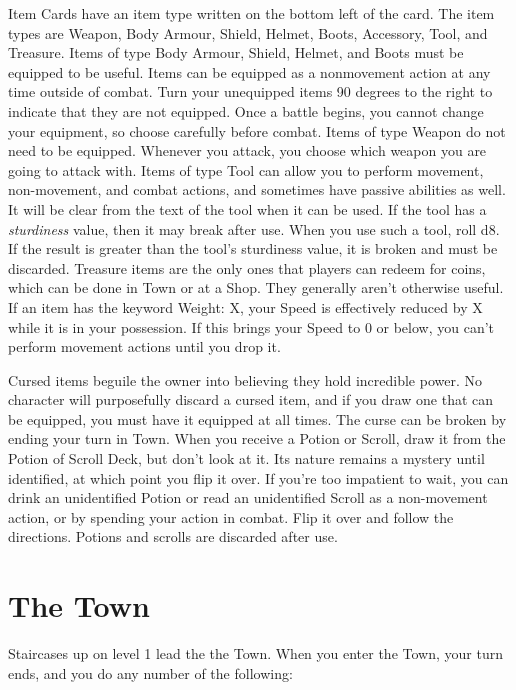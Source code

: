 \documentclass{book}
\begin{document}
Item Cards have an item type written on the bottom left of the card. The item types are Weapon, Body Armour, Shield, Helmet, Boots, Accessory, Tool, and Treasure.
Items of type Body Armour, Shield, Helmet, and Boots must be equipped to be useful. Items can be equipped as a nonmovement action at any time outside of combat. Turn your unequipped items 90 degrees to the right to indicate that they are not equipped. Once a battle begins, you cannot change your equipment, so choose carefully before combat.
Items of type Weapon do not need to be equipped. Whenever you attack, you choose which weapon you are going to attack with.
Items of type Tool can allow you to perform movement, non-movement, and combat actions, and sometimes have passive abilities as well. It will be clear from the text of the tool when it can be used. If the tool has a \emph{sturdiness} value, then it may break after use. When you use such a tool, roll d8. If the result is greater than the tool’s sturdiness value, it is broken and must be discarded.
Treasure items are the only ones that players can redeem for coins, which can be done in Town or at a Shop. They generally aren’t otherwise useful.
If an item has the keyword Weight: X, your Speed is effectively reduced by X while it is in your possession.  If this brings your Speed to 0 or below, you can’t perform movement actions until you drop it.

Cursed items beguile the owner into believing they hold incredible power. No character will purposefully discard a cursed item, and if you draw one that can be equipped, you must have it equipped at all times. The curse can be broken by ending your turn in Town.
When you receive a Potion or Scroll, draw it from the Potion of Scroll Deck, but don’t look at it. Its nature remains a mystery until identified, at which point you flip it over. If you’re too impatient to wait, you can drink an unidentified Potion or read an unidentified Scroll as a non-movement action, or by spending your action in combat.  Flip it over and follow the directions. Potions and scrolls are discarded after use.

\section{The Town} \label{town}

Staircases up on level 1 lead the the Town. When you enter the Town, your turn ends, and you do any number of the following:
\end{document}
